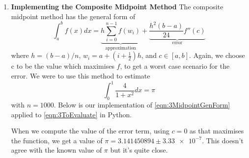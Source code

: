 \documentclass[12pt]{article}
\begin{document}
\begin{enumerate}
        \item \textbf{Implementing the Composite Midpoint Method} \newline
        The composite midpoint method has the general form of 
        \begin{equation}
            \int_a^b f(x)dx = \underbrace{h\sum_{i=0}^{n-1}f(w_i)}_\text{approximation}
            +\underbrace{\frac{h^2(b-a)}{24}f''(c)}_\text{error}
            \label{eqn:3MidpointGenForm}
        \end{equation}
        where $h=(b-a)/n$, $w_i=a+(i+\frac{1}{2})h$, and $c\in[a,b]$. Again, we choose c to be 
        the value which maximises $f$, to get a worst case scenario for the error. We were to use 
        this method to estimate 
        \begin{equation}
            \int_0^1 \frac{4}{1+x^2}dx = \pi
            \label{eqn:3ToEvaluate}
        \end{equation}
        with $n=1000$. Below is our implementation of \autoref{eqn:3MidpointGenForm} applied to 
        \autoref{eqn:3ToEvaluate} in Python.
        \newline
        
        
        When we compute the value of the error term, using $c=0$ as that maximises the function, 
        we get a value of $\pi = 3.141450894 \pm \num{3.33e-7}$. This doesn't agree with the known 
        value of $\pi$ but it's quite close.
    \end{enumerate}
\end{document}
